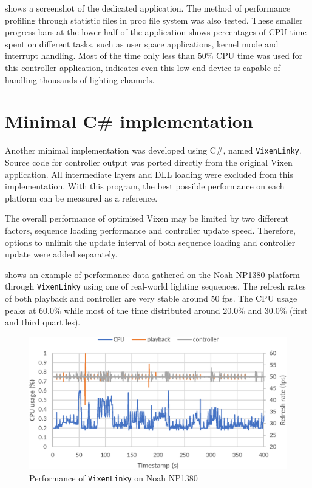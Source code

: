  shows a screenshot of the dedicated application. The method of performance profiling through statistic files in proc file system was also tested. These smaller progress bars at the lower half of the application shows percentages of CPU time spent on different tasks, such as user space applications, kernel mode and interrupt handling. Most of the time only less than $50 \%$ CPU time was used for this controller application, indicates even this low-end device is capable of handling thousands of lighting channels.

\section{Minimal C\# implementation}

Another minimal implementation was developed using C\#, named \texttt{VixenLinky}. Source code for controller output was ported directly from the original Vixen application. All intermediate layers and DLL loading were excluded from this implementation. With this program, the best possible performance on each platform can be measured as a reference.

The overall performance of optimised Vixen may be limited by two different factors, sequence loading performance and controller update speed. Therefore, options to unlimit the update interval of both sequence loading and controller update were added separately.

 shows an example of performance data gathered on the Noah NP1380 platform through \texttt{VixenLinky} using one of real-world lighting sequences. The refresh rates of both playback and controller are very stable around 50 fps. The CPU usage peaks at $60.0 \%$ while most of the time distributed around $20.0 \%$ and $30.0 \%$ (first and third quartiles).

\begin{figure}[!t]
  \centering
  \includegraphics[width=0.8\columnwidth]{Figs/vixenlinky_noah.eps}
  \caption{Performance of \texttt{VixenLinky} on Noah NP1380}
  \label{fig:vixenlinky_noah}
\end{figure}
